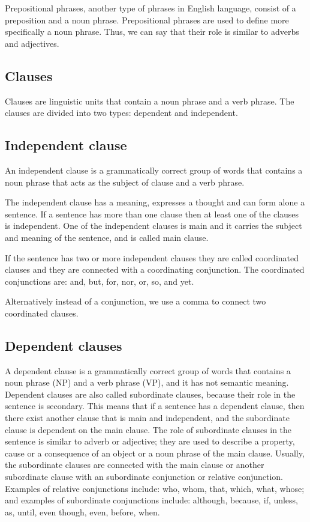 \vspace{4mm}
 
Prepositional phrases, another type of phrases in English language, consist of a preposition and a noun phrase. Prepositional phrases are used to define more specifically a noun phrase. Thus, we can say that their role is similar to adverbs and adjectives.
 
\subsection{Clauses}

Clauses are linguistic units that contain a noun phrase and a verb phrase. The clauses are divided into two types: dependent and independent. 

\subsection{Independent clause}

An independent clause is a grammatically correct group of words that contains a noun phrase that acts as the subject of clause and a verb phrase. 

The independent clause has a meaning, expresses a thought and can form alone a sentence. If a sentence has more than one clause then at least one of the clauses is independent. One of the independent clauses is main and it carries the subject and meaning of the sentence, and is called main clause. 

If the sentence has two or more independent clauses they are called coordinated clauses and they are connected with a coordinating conjunction. The coordinated conjunctions are: and, but, for, nor, or, so, and yet.

Alternatively instead of a conjunction, we use a comma to connect two coordinated clauses.

\subsection{Dependent clauses}

A dependent clause is a grammatically correct group of words that contains a noun phrase (NP) and a verb phrase (VP), and it has not semantic meaning. Dependent clauses are also called subordinate clauses, because their role in the sentence is secondary. This means that if a sentence has a dependent clause, then there exist another clause that is main and independent, and the subordinate clause is dependent on the main clause. The role of subordinate clauses in the sentence is similar to adverb or adjective; they are used to describe a property, cause or a consequence of an object or a noun phrase of the main clause. Usually, the subordinate clauses are connected with the main clause or another subordinate clause with an subordinate conjunction or relative conjunction. Examples of relative conjunctions include: who, whom, that, which, what, whose; and examples of subordinate conjunctions include: although, because, if, unless, as, until, even though, even, before, when.
 
